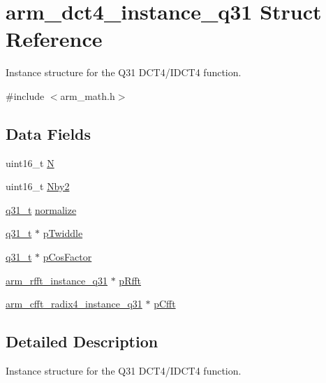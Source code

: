\hypertarget{structarm__dct4__instance__q31}{}\section{arm\+\_\+dct4\+\_\+instance\+\_\+q31 Struct Reference}
\label{structarm__dct4__instance__q31}


Instance structure for the Q31 D\+C\+T4/\+I\+D\+C\+T4 function.  




{\ttfamily \#include $<$arm\+\_\+math.\+h$>$}

\subsection*{Data Fields}
\begin{DoxyCompactItemize}
\item 
uint16\+\_\+t \mbox{\hyperlink{structarm__dct4__instance__q31_a37d49571fe35012087153c093705cd11}{N}}
\item 
uint16\+\_\+t \mbox{\hyperlink{structarm__dct4__instance__q31_afa64b1618089e35c2b55cff71cb29715}{Nby2}}
\item 
\mbox{\hyperlink{arm__math_8h_adc89a3547f5324b7b3b95adec3806bc0}{q31\+\_\+t}} \mbox{\hyperlink{structarm__dct4__instance__q31_a3a2f571658a202a38fa508098001b47c}{normalize}}
\item 
\mbox{\hyperlink{arm__math_8h_adc89a3547f5324b7b3b95adec3806bc0}{q31\+\_\+t}} $\ast$ \mbox{\hyperlink{structarm__dct4__instance__q31_a2505b7d5ec077b244c712797a5253b6d}{p\+Twiddle}}
\item 
\mbox{\hyperlink{arm__math_8h_adc89a3547f5324b7b3b95adec3806bc0}{q31\+\_\+t}} $\ast$ \mbox{\hyperlink{structarm__dct4__instance__q31_af06acf18dc6547fc29aba2eb68cc63f0}{p\+Cos\+Factor}}
\item 
\mbox{\hyperlink{structarm__rfft__instance__q31}{arm\+\_\+rfft\+\_\+instance\+\_\+q31}} $\ast$ \mbox{\hyperlink{structarm__dct4__instance__q31_a16c74f8496e1691e62da3c57e0c676eb}{p\+Rfft}}
\item 
\mbox{\hyperlink{structarm__cfft__radix4__instance__q31}{arm\+\_\+cfft\+\_\+radix4\+\_\+instance\+\_\+q31}} $\ast$ \mbox{\hyperlink{structarm__dct4__instance__q31_a0b1f4a05c1824bab3b9bd837a260232a}{p\+Cfft}}
\end{DoxyCompactItemize}


\subsection{Detailed Description}
Instance structure for the Q31 D\+C\+T4/\+I\+D\+C\+T4 function. 

